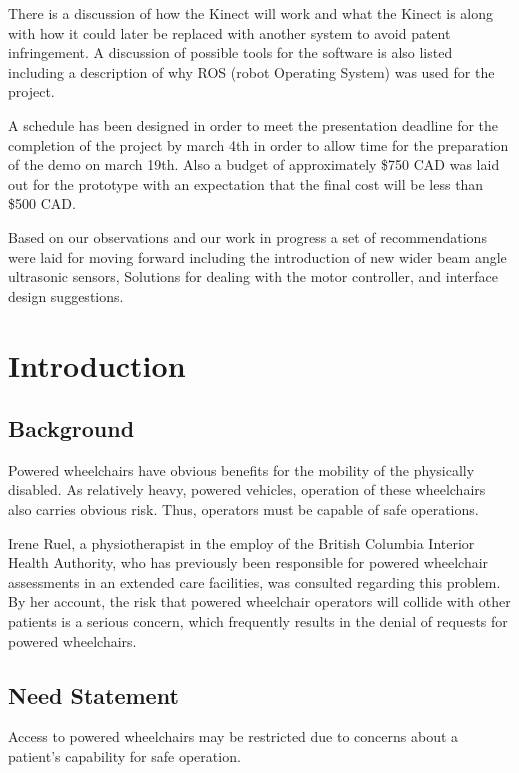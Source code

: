 \documentclass[oneside,final,a4paper]{report}
\begin{document}
There is a discussion of how the Kinect will work and what the Kinect is along with how it could later be replaced with another system to avoid patent infringement. A discussion of possible tools for the software is also listed including a description of why ROS (robot Operating System) was used for the project.

A schedule has been designed in order to meet the presentation deadline for the completion of the project by march 4th in order to allow time for the preparation of the demo on march 19th. Also a budget of approximately \$750 CAD was laid out for the prototype with an expectation that the final cost will be less than \$500 CAD. 

Based on our observations and our work in progress a set of recommendations were laid for moving forward including the introduction of new wider beam angle ultrasonic sensors, Solutions for dealing with the motor controller, and interface design suggestions.


\clearpage
\setcounter{page}{1}
\pagestyle{headings}

\chapter{Introduction}

\section{Background}
Powered wheelchairs have obvious benefits for the mobility of the physically disabled.  As relatively heavy, powered vehicles, operation of these wheelchairs also carries obvious risk.  Thus, operators must be capable of safe operations.

Irene Ruel, a physiotherapist in the employ of the British Columbia Interior Health Authority, who has previously been responsible for powered wheelchair assessments in an extended care facilities, was consulted regarding this problem.  By her account, the risk that powered wheelchair operators will collide with other patients is a serious concern, which frequently results in the denial of requests for powered wheelchairs.

\section{Need Statement}
Access to powered wheelchairs may be restricted due to concerns about a patient's capability for safe operation.
\end{document}
